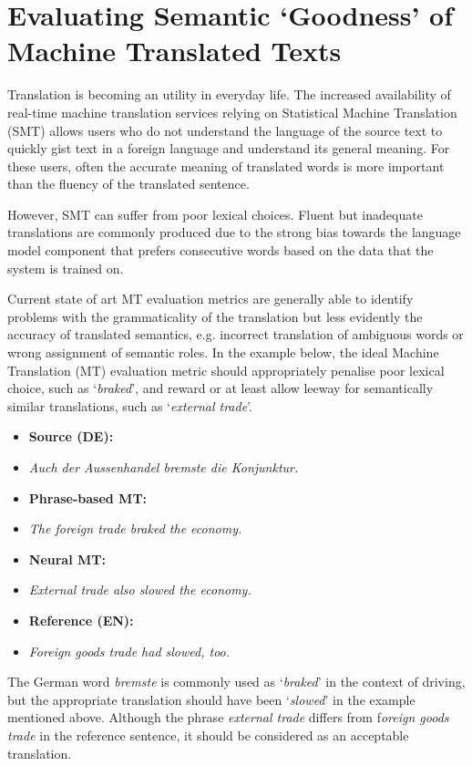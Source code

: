 \newpage
\section{Evaluating Semantic `Goodness' of Machine Translated Texts}

Translation is becoming an utility in everyday life. The increased availability of real-time machine translation services relying on Statistical Machine Translation (SMT) allows users who do not understand the language of the source text to quickly gist text in a foreign language and understand its general meaning. For these users, often the accurate meaning of translated words is more important than the fluency of the translated sentence.

However, SMT can suffer from poor lexical choices. Fluent but inadequate translations are commonly produced due to the strong bias towards the language model component that prefers consecutive words based on the data that the system is trained on.

Current state of art MT evaluation metrics are generally able to identify problems with the grammaticality of the translation but less evidently the accuracy of translated semantics, e.g. incorrect translation of ambiguous words or wrong assignment of semantic roles. In the example below, the ideal Machine Translation (MT) evaluation metric should appropriately penalise poor lexical choice, such as `\textit{braked}', and reward or at least allow leeway for semantically similar translations, such as `\textit{external trade}'.

\begin{itemize}[noitemsep]
\item[] \textbf{Source (DE):} 
\item[] \textit{Auch der Aussenhandel bremste die Konjunktur.} 
\item[] \textbf{Phrase-based MT:} 
\item[] \textit{The foreign trade braked the economy.}
\item[] \textbf{Neural MT:} 
\item[] \textit{External trade also slowed the economy.}
\item[] \textbf{Reference (EN):} 
\item[] \textit{Foreign goods trade had slowed, too.}
\end{itemize}

The German word \textit{bremste} is commonly used as `\textit{braked}' in the context of driving, but the appropriate translation should have been `\textit{slowed}' in the example mentioned above. Although the phrase \textit{external trade} differs from f\textit{oreign goods trade} in the reference sentence, it should be considered as an acceptable translation.

